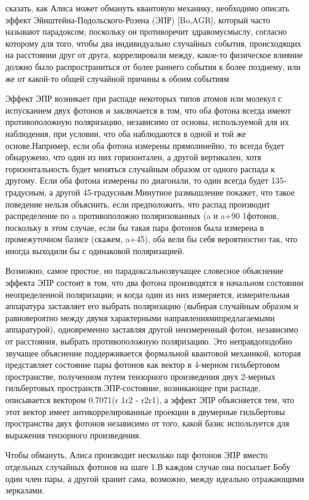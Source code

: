 ­­сказать, как Алиса может обмануть квантовую механику, необходимо описать эффект Эйнштейна-Подольского-Розена (ЭПР) [Bo,AGR], который часто называют парадоксом, поскольку он противоречит здравомусмыслу, согласно которому для того, чтобы два индивидуально случайных события, происходящих на расстоянии друг от друга, коррелировали между, какое-то физическое влияние должно было распространиться от более раннего события к более позднему, или же от какой-то общей случайной причины к обоим событиям

­­­­Эффект ЭПР возникает при распаде некоторых типов атомов или молекул с испусканием двух фотонов и заключается в том, что оба фотона всегда имеют противоположную поляризацию, независимо от основы, используемой для их наблюдения, при условии, что оба наблюдаются в одной и той же основе.Например, если оба фотона измерены прямолинейно, то всегда будет обнаружено, что один из них горизонтален, а другой вертикален, хотя горизонтальность будет меняться случайным образом от одного распада к другому. Если оба фотона измерены по диагонали, то один всегда будет 135-градусным, а другой 45-градусным.Минутное размышление покажет, что такое поведение нельзя объяснить, если предположить, что распад производит распределение по a противоположно поляризованных (a и a+90 1фотонов, поскольку в этом случае, если бы такая пара фотонов была измерена в промежуточном базисе (скажем, a+45), оба вели бы себя вероятностно так, что иногда выходили бы с одинаковой поляризацией.

­­­­Возможно, самое простое, но парадоксальнозвучащее словесное объяснение эффекта ЭПР состоит в том, что два фотона производятся в начальном состоянии неопределенной поляризации; и когда один из них измеряется, измерительная аппаратура заставляет его выбрать поляризацию (выбирая случайным образом и равновероятно между двумя характерными направлениямипредлагаемыми аппаратурой), одновременно заставляя другой неизмеренный фотон, независимо от расстояния, выбрать противоположную поляризацию. Это неправдоподобно звучащее объяснение поддерживается формальной квантовой механикой, которая представляет состояние пары фотонов как вектор в 4-мерном гильбертовом пространстве, полученном путем тензорного произведения двух 2-мерных гильбертовых пространств.ЭПР-состояние, возникающее при распаде, описывается вектором 0.7071(r 1r2 - r2r1), а эффект ЭПР объясняется тем, что этот вектор имеет антикоррелированные проекции в двумерные гильбертовы пространства двух фотонов независимо от того, какой базис используется для выражения тензорного произведения.

­­­Чтобы обмануть, Алиса производит несколько пар фотонов ЭПР вместо отдельных случайных фотонов на шаге 1.В каждом случае она посылает Бобу один член пары, а другой хранит сама, возможно, между идеально отражающими зеркалами.

\subsection{\review}

\subsection{\dic}
